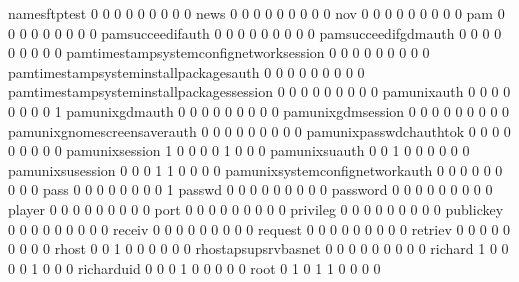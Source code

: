 \documentclass[compress,8pt]{beamer}
\begin{document}
\begin{frame}
\begin{Schunk}
  namesftptest                               0   0   0   0   0   0   0   0   0
  news                                       0   0   0   0   0   0   0   0   0
  nov                                        0   0   0   0   0   0   0   0   0
  pam                                        0   0   0   0   0   0   0   0   0
  pamsucceedifauth                           0   0   0   0   0   0   0   0   0
  pamsucceedifgdmauth                        0   0   0   0   0   0   0   0   0
  pamtimestampsystemconfignetworksession     0   0   0   0   0   0   0   0   0
  pamtimestampsysteminstallpackagesauth      0   0   0   0   0   0   0   0   0
  pamtimestampsysteminstallpackagessession   0   0   0   0   0   0   0   0   0
  pamunixauth                                0   0   0   0   0   0   0   0   1
  pamunixgdmauth                             0   0   0   0   0   0   0   0   0
  pamunixgdmsession                          0   0   0   0   0   0   0   0   0
  pamunixgnomescreensaverauth                0   0   0   0   0   0   0   0   0
  pamunixpasswdchauthtok                     0   0   0   0   0   0   0   0   0
  pamunixsession                             1   0   0   0   0   1   0   0   0
  pamunixsuauth                              0   0   1   0   0   0   0   0   0
  pamunixsusession                           0   0   0   1   1   0   0   0   0
  pamunixsystemconfignetworkauth             0   0   0   0   0   0   0   0   0
  pass                                       0   0   0   0   0   0   0   0   1
  passwd                                     0   0   0   0   0   0   0   0   0
  password                                   0   0   0   0   0   0   0   0   0
  player                                     0   0   0   0   0   0   0   0   0
  port                                       0   0   0   0   0   0   0   0   0
  privileg                                   0   0   0   0   0   0   0   0   0
  publickey                                  0   0   0   0   0   0   0   0   0
  receiv                                     0   0   0   0   0   0   0   0   0
  request                                    0   0   0   0   0   0   0   0   0
  retriev                                    0   0   0   0   0   0   0   0   0
  rhost                                      0   0   1   0   0   0   0   0   0
  rhostapsupsrvbasnet                        0   0   0   0   0   0   0   0   0
  richard                                    1   0   0   0   0   1   0   0   0
  richarduid                                 0   0   0   1   0   0   0   0   0
  root                                       0   1   0   1   1   0   0   0   0

\end{Schunk}
\end{frame}
\end{document}
